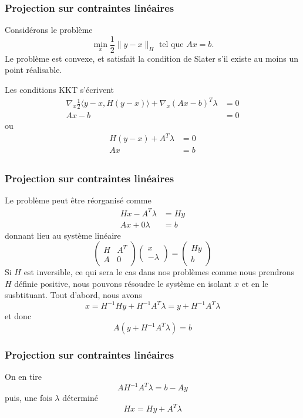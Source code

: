 \documentclass[usepdftitle=false]{beamer}
\begin{document}
\begin{frame}
	\frametitle{Projection sur contraintes linéaires}
	
	Considérons le problème
	$$
	\min_x \frac{1}{2} \| y - x \|_H \mbox{ tel que } Ax = b.
	$$
	Le problème est convexe, et satisfait la condition de Slater s'il existe au moins un point réalisable.
	
	\mbox{}
	
	Les conditions KKT s'écrivent
	\begin{align*}
	\nabla_x \frac{1}{2} \langle y-x, H(y-x) \rangle
	+ \nabla_x(Ax - b)^T \lambda &= 0 \\
	Ax - b & = 0 %
	\end{align*}
	ou
	\begin{align*}
	H(y-x) + A^T \lambda &= 0 \\
	Ax & = b \\
	\end{align*}
	
\end{frame}

\begin{frame}
	\frametitle{Projection sur contraintes linéaires}
	
	Le problème peut être réorganisé comme
	\begin{align*}
	Hx - A^T \lambda &= Hy \\
	Ax + 0\lambda & = b
	\end{align*}
	donnant lieu au système linéaire
	$$
	\begin{pmatrix}
	H & A^T \\ A & 0
	\end{pmatrix}
	\begin{pmatrix}
	x \\ -\lambda
	\end{pmatrix}
	=
	\begin{pmatrix}
	Hy \\ b
	\end{pmatrix}
	$$
	Si $H$ est inversible, ce qui sera le cas dans nos problèmes comme nous prendrons $H$ définie positive, nous pouvons résoudre le système en isolant $x$ et en le susbtituant.
	Tout d'abord, nous avons
	$$
	x = H^{-1}Hy+H^{-1}A^T \lambda = y+H^{-1}A^T \lambda
	$$
	et donc
	$$
	A\left(y+H^{-1}A^T \lambda\right) = b
	$$
	
\end{frame}

\begin{frame}
	\frametitle{Projection sur contraintes linéaires}
	
	On en tire
	$$
	AH^{-1}A^T \lambda = b - Ay
	$$
	puis, une fois $\lambda$ déterminé
	$$
	Hx = Hy + A^T \lambda
	$$
	
	
\end{frame}
\end{document}
